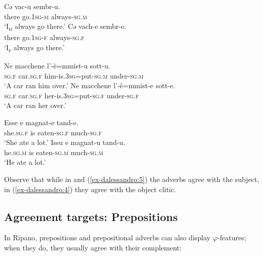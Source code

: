 \documentclass[output=paper
,modfonts
,nonflat]{langsci/langscibook}
\begin{document}
\begin{exe}
	\ex \label{ex-dalessandro:3}
	\xlist
	\ex \label{ex-dalessandro:3a}
	\gll  Cə   vac-u    sembr-u.\\
	there  go.1\textsc{sg-m} always-\textsc{sg.m}\\
	\glt `I\textsc{\textsubscript{m}} always go there.' 
	\ex \label{ex-dalessandro:3b}
	\gll Cə  vach-e    sembr-e.\\
	there  go.1\textsc{sg-f} always-\textsc{sg.f}\\
	\glt `I\textsc{\textsubscript{f}} always go there.' 
	\endxlist
\end{exe}
\begin{exe}
	\ex\label{ex-dalessandro:4} \xlist
	\ex 
	\gll Ne   macchene   l’-è=mmist-u    sott-u.\\
	\textsc{sg.f} car.\textsc{sg.f} him-is.\textsc{3sg=}put-\textsc{sg.m} under-\textsc{sg.m}\\
	\glt `A car ran him over.' 
	\ex
	\gll  Ne   macchene   l’-è=mmist-e    sott-e.\\
	\textsc{sg.f} car.\textsc{sg.f} her-is.\textsc{3sg=}put-\textsc{sg.f} under-\textsc{sg.f}\\
	\glt `A car ran her over.'  
	\endxlist
\end{exe}
\begin{exe}
	\ex \label{ex-dalessandro:5}\citet[45--46]{Lambertelli2003} \xlist
	\ex 
	\gll  Esse   e   magnat-e   tand-e.\\
	she.\textsc{sg.f} is  eaten-\textsc{sg.f} much-\textsc{sg.f}\\
	\glt `She ate a lot.' 
	\ex
	\gll Issu   e  magnat-u   tand-u.\\
	he.\textsc{sg.m} is  eaten-\textsc{sg.m} much-\textsc{sg.m}\\
	\glt `He ate a lot.' 
	\endxlist
\end{exe}
Observe that while in  and (\ref{ex-dalessandro:5}) the adverbs agree with the subject, in (\ref{ex-dalessandro:4}) they agree with the object clitic. 

\subsection{Agreement targets: Prepositions} \label{sec-dalessandro:1.3}
In Ripano, prepositions and prepositional adverbs can also display $\varphi$-features; when they do, they usually agree with their complement:
\end{document}
